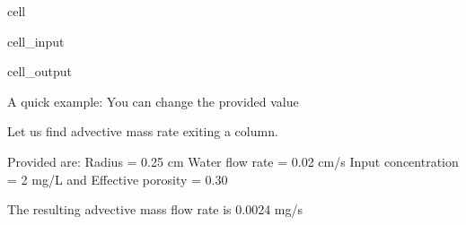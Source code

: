 \documentclass[letterpaper,10pt,english]{jupyterBook}
\begin{document}
\begin{sphinxuseclass}{cell}
\begin{sphinxVerbatimInput}
\begin{sphinxuseclass}{cell_input}
\begin{sphinxVerbatim}[commandchars=\\\{\}]
    
\end{sphinxVerbatim}

\end{sphinxuseclass}\end{sphinxVerbatimInput}
\begin{sphinxVerbatimOutput}

\begin{sphinxuseclass}{cell_output}
\begin{sphinxVerbatim}[commandchars=\\\{\}]
A quick example: You can change the provided value

Let us find advective mass rate exiting a column.

Provided are:
Radius = 0.25 cm
Water flow rate = 0.02 cm/s
Input concentration = 2 mg/L and
Effective porosity = 0.30 

The resulting advective mass flow rate is 0.0024 mg/s
\end{sphinxVerbatim}

\end{sphinxuseclass}\end{sphinxVerbatimOutput}

\end{sphinxuseclass}
\end{document}
